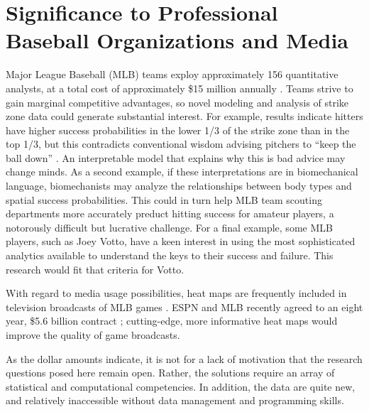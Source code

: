 \section{Significance to Professional Baseball Organizations and Media}

Major League Baseball (MLB\textsuperscript{\textregistered}) teams exploy approximately 156 quantitative analysts, at a total cost of approximately \$15 million annually \citep{Lindbergh2016}. Teams strive to gain marginal competitive advantages, so novel modeling and analysis of strike zone data could generate substantial interest. For example, results indicate hitters have higher success probabilities in the lower 1/3 of the strike zone than in the top 1/3, but this contradicts conventional wisdom advising pitchers to ``keep the ball down'' \citep{Stallings2003}. An interpretable model that explains why this is bad advice may change minds. As a second example, if these interpretations are in biomechanical language, biomechanists may analyze the relationships between body types and spatial success probabilities. This could in turn help MLB\textsuperscript{\textregistered} team scouting departments more accurately preduct hitting success for amateur players, a notorously difficult but lucrative challenge. For a final example, some MLB\textsuperscript{\textregistered} players, such as Joey Votto, have a keen interest in using the most sophisticated analytics available to understand the keys to their success and failure\citep{Daugherty2015}. This research would fit that criteria for Votto.

With regard to media usage possibilities, heat maps are frequently included in television broadcasts of MLB\textsuperscript{\textregistered} games \citep{Cross2015}. ESPN\textsuperscript{\textregistered} and MLB\textsuperscript{\textregistered} recently agreed to an eight year, \$5.6 billion contract \citep{Newman2012}; cutting-edge, more informative heat maps would improve the quality of game broadcasts.

As the dollar amounts indicate, it is not for a lack of motivation that the research questions posed here remain open. Rather, the solutions require an array of statistical and computational competencies. In addition, the data are quite new, and relatively inaccessible without data management and programming skills.



